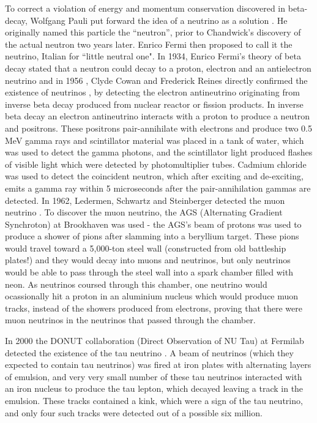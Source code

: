 To correct a violation of energy and momentum conservation discovered in beta-decay, Wolfgang Pauli put forward the idea of a neutrino as a solution \cite{brown_idea_1978}.  He originally named this particle the ``neutron'', prior to Chandwick's discovery of the actual neutron two years later.  Enrico Fermi then proposed to call it the neutrino, Italian for ``little neutral one". In 1934, Enrico Fermi's theory of beta decay stated that a neutron could decay to a proton, electron and an antielectron neutrino and in 1956 \cite{luca_electroweak}, Clyde Cowan and Frederick Reines directly confirmed the existence of neutrinos \cite{cowan_reines}, by detecting the electron antineutrino originating from inverse beta decay produced from nuclear reactor or fission products. In inverse beta decay an electron antineutrino interacts with a proton to produce a neutron and positrons.
\newline
These positrons pair-annihilate with electrons and produce two 0.5 MeV gamma rays and scintillator material was placed in a tank of water, which was used to detect the gamma photons, and the scintillator light produced flashes of visible light which were detected by photomultiplier tubes. Cadmium chloride was used to detect the coincident neutron, which after exciting and de-exciting, emits a gamma ray within 5 microseconds after the pair-annihilation gammas are detected. In 1962, Ledermen, Schwartz and Steinberger detected the muon neutrino \cite{muon_neutrino}. To discover the muon neutrino, the AGS (Alternating Gradient Synchroton) at Brookhaven was used - the AGS's beam of protons was used to produce a shower of pions after slamming into a beryllium target. These pions would travel toward a 5,000-ton steel wall (constructed from old battleship plates!) and they would decay into muons and neutrinos, but only neutrinos would be able to pass through the steel wall into a spark chamber filled with neon. As neutrinos coursed through this chamber, one neutrino would ocassionally hit a proton in an aluminium nucleus which would produce muon tracks, instead of the showers produced from electrons, proving that there were muon neutrinos in the neutrinos that passed through the chamber. 
\newline

In 2000 the DONUT collaboration (Direct Observation of NU Tau) at Fermilab detected the existence of the tau neutrino \cite{lederman_schwartz}. A beam of neutrinos (which they expected to contain tau neutrinos) was fired at iron plates with alternating layers of emulsion, and very very small number of these tau neutrinos interacted with an iron nucleus to produce the tau lepton, which decayed leaving a track in the emulsion. These tracks contained a kink, which were a sign of the tau neutrino, and only four such tracks were detected out of a possible six million.

